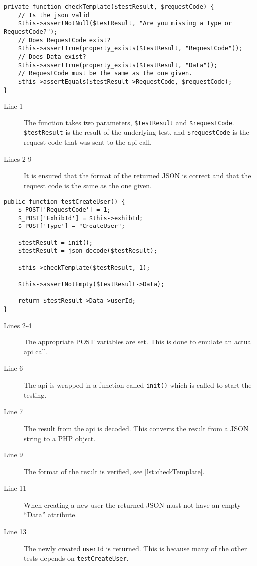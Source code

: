 \begin{lstlisting}[language=phpstyle, label=lst:checkTemplate, caption={\lstinline|checkTemplate| unit test}]
private function checkTemplate($testResult, $requestCode) {
    // Is the json valid
    $this->assertNotNull($testResult, "Are you missing a Type or RequestCode?");
    // Does RequestCode exist?
    $this->assertTrue(property_exists($testResult, "RequestCode"));
    // Does Data exist?
    $this->assertTrue(property_exists($testResult, "Data"));    
    // RequestCode must be the same as the one given.
    $this->assertEquals($testResult->RequestCode, $requestCode);
}
\end{lstlisting}%
\begin{description}
\item[Line 1] The function takes two parameters, \lstinline|$testResult| and \lstinline|$requestCode|. \lstinline|$testResult| is the result of the underlying test, and \lstinline|$requestCode| is the request code that was sent to the \ac{api} call.
\item[Lines 2-9] It is ensured that the format of the returned JSON is correct and that the request code is the same as the one given. 
\end{description}

\begin{lstlisting}[language=phpstyle, label=lst:testCreateUser, caption={\lstinline|createUser| unit test}]
public function testCreateUser() {
    $_POST['RequestCode'] = 1;
    $_POST['ExhibId'] = $this->exhibId;
    $_POST['Type'] = "CreateUser";

    $testResult = init();
    $testResult = json_decode($testResult);

    $this->checkTemplate($testResult, 1);

    $this->assertNotEmpty($testResult->Data);
    
    return $testResult->Data->userId;      
}
\end{lstlisting}%
\begin{description}
\item[Lines 2-4] The appropriate POST variables are set. This is done to emulate an actual \ac{api} call.
\item[Line 6] The \ac{api} is wrapped in a function called \lstinline|init()| which is called to start the testing.
\item[Line 7] The result from the \ac{api} is decoded. This converts the result from a JSON string to a PHP object.
\item[Line 9] The format of the result is verified, see \autoref{lst:checkTemplate}.
\item[Line 11] When creating a new user the returned JSON must not have an empty ``Data'' attribute.
\item[Line 13] The newly created \lstinline|userId| is returned. This is because many of the other tests depends on \lstinline|testCreateUser|.
\end{description}


